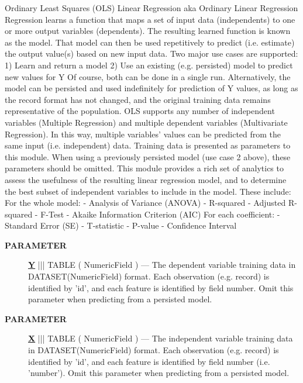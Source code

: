 Ordinary Least Squares (OLS) Linear Regression aka Ordinary Linear Regression Regression learns a function that maps a set of input data (independents) to one or more output variables (dependents). The resulting learned function is known as the model. That model can then be used repetitively to predict (i.e. estimate) the output value(s) based on new input data. Two major use cases are supported: 1) Learn and return a model 2) Use an existing (e.g. persisted) model to predict new values for Y Of course, both can be done in a single run. Alternatively, the model can be persisted and used indefinitely for prediction of Y values, as long as the record format has not changed, and the original training data remains representative of the population. OLS supports any number of independent variables (Multiple Regression) and multiple dependent variables (Multivariate Regression). In this way, multiple variables' values can be predicted from the same input (i.e. independent) data. Training data is presented as parameters to this module. When using a previously persisted model (use case 2 above), these parameters should be omitted. This module provides a rich set of analytics to assess the usefulness of the resulting linear regression model, and to determine the best subset of independent variables to include in the model. These include: For the whole model: - Analysis of Variance (ANOVA) - R-squared - Adjusted R-squared - F-Test - Akaike Information Criterion (AIC) For each coefficient: - Standard Error (SE) - T-statistic - P-value - Confidence Interval






\par
\begin{description}
\item [\colorbox{tagtype}{\color{white} \textbf{\textsf{PARAMETER}}}] \textbf{\underline{Y}} ||| TABLE ( NumericField ) --- The dependent variable training data in DATASET(NumericField) format. Each observation (e.g. record) is identified by 'id', and each feature is identified by field number. Omit this parameter when predicting from a persisted model.
\item [\colorbox{tagtype}{\color{white} \textbf{\textsf{PARAMETER}}}] \textbf{\underline{X}} ||| TABLE ( NumericField ) --- The independent variable training data in DATASET(NumericField) format. Each observation (e.g. record) is identified by 'id', and each feature is identified by field number (i.e. 'number'). Omit this parameter when predicting from a persisted model.
\end{description}









